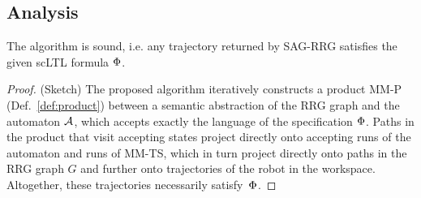\subsection{Analysis}\label{sec:analysis}


\begin{theorem}
The algorithm is sound, i.e. any trajectory returned by SAG-RRG satisfies the given scLTL formula $\Phi$.
\end{theorem}
\begin{proof}
(Sketch) The proposed algorithm iteratively constructs a product MM-P (Def.~\ref{def:product}) between a semantic abstraction of the RRG graph and the automaton $\mathcal{A}$, which accepts exactly the language of the specification $\Phi$. Paths in the product that visit accepting states 
project directly onto accepting runs of the automaton and runs of MM-TS, which in turn project directly onto paths in the RRG graph $G$ and further onto trajectories of the robot in the workspace. Altogether, these trajectories necessarily satisfy~$\Phi$.
\end{proof}

